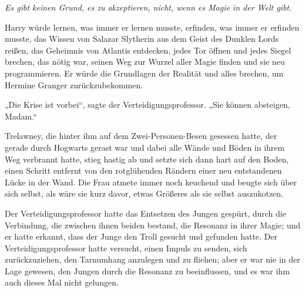 \emph{Es gibt keinen Grund, es zu akzeptieren, nicht, wenn es Magie in der Welt gibt.}


Harry würde lernen, was immer er lernen musste, erfinden, was immer er erfinden musste, das Wissen von Salazar Slytherin aus dem Geist des Dunklen Lords reißen, das Geheimnis von Atlantis entdecken, jedes Tor öffnen und jedes Siegel brechen, das nötig war, seinen Weg zur Wurzel aller Magie finden und sie neu programmieren. Er würde die Grundlagen der Realität und alles brechen, um Hermine Granger zurückzubekommen.

\later

„Die Krise ist vorbei“, sagte der Verteidigungsprofessor.
„Sie können absteigen, Madam.“

Trelawney, die hinter ihm auf dem Zwei-Personen-Besen gesessen hatte, der gerade durch Hogwarts gerast war und dabei alle Wände und Böden in ihrem Weg verbrannt hatte, stieg hastig ab und setzte sich dann hart auf den Boden, einen Schritt entfernt von den rotglühenden Rändern einer neu entstandenen Lücke in der Wand. Die Frau atmete immer noch keuchend und beugte sich über sich selbst, als wäre sie kurz davor, etwas Größeres als sie selbst auszukotzen.

Der Verteidigungsprofessor hatte das Entsetzen des Jungen gespürt, durch die Verbindung, die zwischen ihnen beiden bestand, die Resonanz in ihrer Magie; und er hatte erkannt, dass der Junge den Troll gesucht und gefunden hatte. Der Verteidigungsprofessor hatte versucht, einen Impuls zu senden, sich zurückzuziehen, den Tarnumhang anzulegen und zu fliehen; aber er war nie in der Lage gewesen, den Jungen durch die Resonanz zu beeinflussen, und es war ihm auch dieses Mal nicht gelungen.

